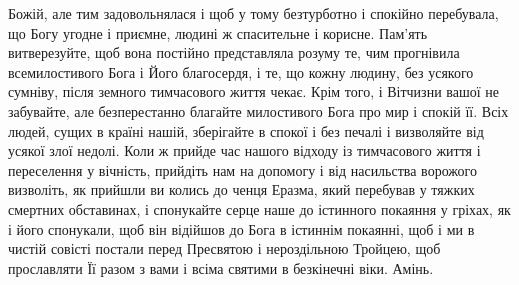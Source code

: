 \documentclass[chapters.tex]{subfiles}
\begin{document}
Божій, але тим задовольнялася і щоб у тому безтурботно і спокійно перебувала, що Богу угодне і приємне, людині ж спасительне і корисне. Пам’ять витверезуйте, щоб вона постійно представляла розуму те, чим прогнівила всемилостивого Бога і Його благосердя, і те, що кожну людину, без усякого сумніву, після земного тимчасового життя чекає. Крім того, і Вітчизни вашої не забувайте, але безперестанно благайте милостивого Бога про мир і спокій її. Всіх людей, сущих в країні нашій, зберігайте в спокої і без печалі і визволяйте від усякої злої недолі. Коли ж прийде час нашого відходу із тимчасового життя і переселення у вічність, прийдіть нам на допомогу і від насильства ворожого визволіть, як прийшли ви колись до ченця Еразма, який перебував у тяжких смертних обставинах, і спонукайте серце наше до істинного покаяння у гріхах, як і його спонукали, щоб він відійшов до Бога в істиннім покаянні, щоб і ми в чистій совісті постали перед Пресвятою і нероздільною Тройцею, щоб прославляти Її разом з вами і всіма святими в безкінечні віки. Амінь.
\end{document}
